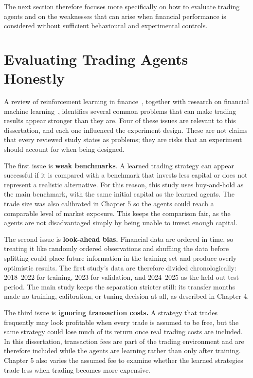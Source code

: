 The next section therefore focuses more specifically on how to evaluate
trading agents and on the weaknesses that can arise when financial
performance is considered without sufficient behavioural and
experimental controls.

\section{Evaluating Trading Agents Honestly}
A review of reinforcement learning in finance~\cite{fischer2018}, together with
research on financial machine learning~\cite{bailey2014, lopezdeprado2018}, identifies several
common problems that can make trading results appear stronger than they
are. Four of these issues are relevant to this dissertation, and each
one influenced the experiment design. These are not claims that every
reviewed study states as problems; they are risks that an experiment
should account for when being designed.

The first issue is \textbf{weak benchmarks}. A learned trading strategy
can appear successful if it is compared with a benchmark that invests
less capital or does not represent a realistic alternative. For this reason,
this study uses buy-and-hold as the main benchmark, with the same
initial capital as the learned agents. The trade size was also
calibrated in Chapter 5 so the agents could reach a comparable level of
market exposure. This keeps the comparison fair, as the agents are not
disadvantaged simply by being unable to invest enough capital.

The second issue is \textbf{look-ahead bias.} Financial data are ordered
in time, so treating it like randomly ordered observations and shuffling
the data before splitting could place future information in the training
set and produce overly optimistic results. The first study's data are
therefore divided chronologically: 2018--2022 for training, 2023 for
validation, and 2024--2025 as the held-out test period. The main study
keeps the separation stricter still: its transfer months made no
training, calibration, or tuning decision at all, as described in
Chapter 4.

The third issue is \textbf{ignoring transaction costs.} A strategy that
trades frequently may look profitable when every trade is assumed to be
free, but the same strategy could lose much of its return once real
trading costs are included. In this dissertation, transaction fees are
part of the trading environment and are therefore included while the
agents are learning rather than only after training. Chapter 5 also
varies the assumed fee to examine whether the learned strategies trade
less when trading becomes more expensive.

